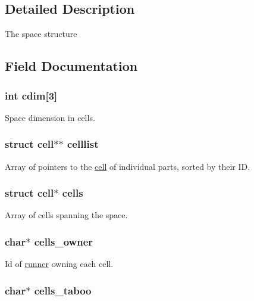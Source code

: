 \subsection{Detailed Description}
The space structure 

\subsection{Field Documentation}
\hypertarget{structspace_abc41c92f496aa850c7dfa0359158d69a}{
\subsubsection[{cdim}]{\setlength{\rightskip}{0pt plus 5cm}int cdim\mbox{[}3\mbox{]}}}\label{structspace_abc41c92f496aa850c7dfa0359158d69a}
Space dimension in cells. \hypertarget{structspace_a32ca6cb42b7d1a9053d50077fba94fe0}{
\subsubsection[{celllist}]{\setlength{\rightskip}{0pt plus 5cm}struct {\bf cell}$\ast$$\ast$ celllist}}\label{structspace_a32ca6cb42b7d1a9053d50077fba94fe0}
Array of pointers to the \hyperlink{structcell}{cell} of individual parts, sorted by their I\-D. \hypertarget{structspace_a5fcdf8d2c127017ce4b6e64090d1cd73}{
\subsubsection[{cells}]{\setlength{\rightskip}{0pt plus 5cm}struct {\bf cell}$\ast$ cells}}\label{structspace_a5fcdf8d2c127017ce4b6e64090d1cd73}
Array of cells spanning the space. \hypertarget{structspace_a5d59d4f2d4e53bd50dfc8464b74f1964}{
\subsubsection[{cells\-\_\-owner}]{\setlength{\rightskip}{0pt plus 5cm}char$\ast$ cells\-\_\-owner}}\label{structspace_a5d59d4f2d4e53bd50dfc8464b74f1964}
Id of \hyperlink{structrunner}{runner} owning each cell. \hypertarget{structspace_af860b180149142663caba8550e2405cb}{
\subsubsection[{cells\-\_\-taboo}]{\setlength{\rightskip}{0pt plus 5cm}char$\ast$ cells\-\_\-taboo}}\label{structspace_af860b180149142663caba8550e2405cb}
